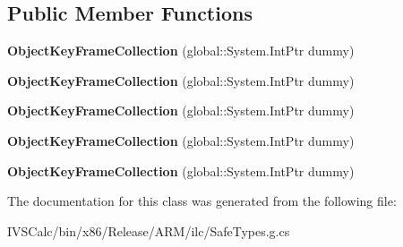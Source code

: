 \subsection*{Public Member Functions}
\begin{DoxyCompactItemize}
\item 
\mbox{\label{class_windows_1_1_u_i_1_1_xaml_1_1_media_1_1_animation_1_1_object_key_frame_collection_a098813056e47bfa537a76004810cf32d}} 
{\bfseries Object\+Key\+Frame\+Collection} (global\+::\+System.\+Int\+Ptr dummy)
\item 
\mbox{\label{class_windows_1_1_u_i_1_1_xaml_1_1_media_1_1_animation_1_1_object_key_frame_collection_a098813056e47bfa537a76004810cf32d}} 
{\bfseries Object\+Key\+Frame\+Collection} (global\+::\+System.\+Int\+Ptr dummy)
\item 
\mbox{\label{class_windows_1_1_u_i_1_1_xaml_1_1_media_1_1_animation_1_1_object_key_frame_collection_a098813056e47bfa537a76004810cf32d}} 
{\bfseries Object\+Key\+Frame\+Collection} (global\+::\+System.\+Int\+Ptr dummy)
\item 
\mbox{\label{class_windows_1_1_u_i_1_1_xaml_1_1_media_1_1_animation_1_1_object_key_frame_collection_a098813056e47bfa537a76004810cf32d}} 
{\bfseries Object\+Key\+Frame\+Collection} (global\+::\+System.\+Int\+Ptr dummy)
\item 
\mbox{\label{class_windows_1_1_u_i_1_1_xaml_1_1_media_1_1_animation_1_1_object_key_frame_collection_a098813056e47bfa537a76004810cf32d}} 
{\bfseries Object\+Key\+Frame\+Collection} (global\+::\+System.\+Int\+Ptr dummy)
\end{DoxyCompactItemize}


The documentation for this class was generated from the following file\+:\begin{DoxyCompactItemize}
\item 
I\+V\+S\+Calc/bin/x86/\+Release/\+A\+R\+M/ilc/Safe\+Types.\+g.\+cs\end{DoxyCompactItemize}
